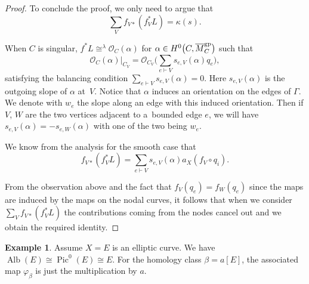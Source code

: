 \documentclass[11pt]{article}
\numberwithin{equation}{section}
\newcommand{\Pic}{\operatorname{Pic}}
\newcommand{\Alb}{\operatorname{Alb}}
\renewcommand{\O}{\mathcal{O}}
\renewcommand{\bar}{\overline}
\numberwithin{equation}{section}
\theoremstyle{definition}
\newtheorem{expl}[theo]{Example}
\begin{document}
\begin{proof}
To conclude the proof, we only need to argue that
\[ \sum_V f_{V\ast}(f_V^*L)=\kappa(s).\]

When $C$ is singular, $f^*L\cong^{\lambda}\O_C(\alpha)$ for $\alpha\in H^0\bigl(C, \bar{M}_C^{\rm gp}\bigr)$ such that
\[\O_C(\alpha)\rvert_{C_V}=\O_{C_V}\biggl(\sum_{e\vdash V}s_{e,V}(\alpha)q_e\biggr),\]
satisfying the balancing condition $\sum_{e\vdash V}s_{e,V}(\alpha)=0$. Here $s_{e,V}(\alpha)$ is the outgoing slope of $\alpha$ at~$V$. Notice that $\alpha$ induces an orientation on the edges of $\Gamma$. We denote with $w_e$ the slope along an edge with this induced orientation. Then if $V$, $W$ are the two vertices adjacent to a~bounded edge $e$, we will have $s_{e,V}(\alpha)=-s_{e,W}(\alpha)$ with one of the two being $w_e$.

 We know from the analysis for the smooth case that
 \[f_{V\ast}(f_V^*L)=\sum_{e\vdash V}s_{e,V}(\alpha) a_X(f_V\circ q_i).\]

 From the observation above and the fact that $f_V(q_e)=f_W(q_e)$ since the maps are induced by the maps on the nodal curves, it follows that when we consider $\sum_Vf_{V\ast}(f_V^*L)$ the contributions coming from the nodes cancel out and we obtain the required identity.
\end{proof}

\begin{expl}
 Assume $X=E$ is an elliptic curve. We have $\Alb(E)\cong\Pic^0(E)\cong E$. For the homology class $\beta=a[E]$, the associated map $\varphi_\beta$ is just the multiplication by $a$.
\end{expl}
\end{document}
